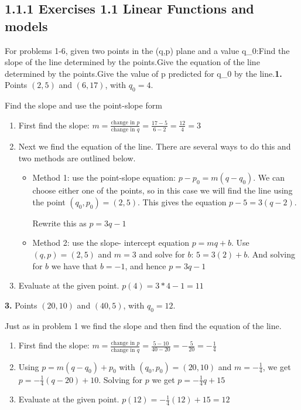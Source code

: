 \documentclass[10pt,]{book}
\theoremstyle{plain}
\theoremstyle{definition}
\begin{document}
\subsection*{1.1.1 Exercises 1.1 Linear Functions and models}
For problems 1-6, given two points in the (q,p) plane and a value q_0:Find the slope of the line determined by the points.Give the equation of the line determined by the points.Give the value of p predicted for q_0 by the line.\noindent\textbf{1.}\quad{} 
Points \((2,5)\) and \((6,17)\), with \(q_0=4\).
%
\par\smallskip
Find the slope and use the point-slope form%
\par\smallskip
\leavevmode%
\begin{enumerate}[label=(\alph*)]
\item\hypertarget{li-4}{}First find the slope: \(m=  \frac{\text{change in }p}{\text{change in }q}
=  \frac{17-5}{6-2}=\frac{12}{4}=3\)%
\item\hypertarget{li-5}{}Next we find the equation of the line. There are several ways to do this and two methods are outlined below.%
%
\begin{itemize}[label=\textbullet]
\item{}Method 1: use the point-slope equation: \(p-p_0=m (q-q_0)\).
We can choose either one of the points, so in this case we will find the line using the point \((q_0,p_0 )=(2,5)\). This gives the equation
\(p-5=3 (q-2)\).%
\par
Rewrite this as \(p=3q-1\)%
\item{}Method 2: use the slope- intercept equation \(p=m q+b\).
Use \((q,p)=(2,5)\) and \(m = 3\) and solve for \(b\):
\(5=3 (2)+b\).
And solving for \(b\) we have that \(b= -1\), and hence \(p=3q-1\)%
\end{itemize}
\item\hypertarget{li-8}{}Evaluate at the given point.  \(p(4)=3*4-1=11\)%
\end{enumerate}
\par\smallskip
\noindent\textbf{3.}\quad{} Points \((20,10)\) and \((40,5)\), with \(q_0=12\).
%
\par\smallskip
Just as in problem 1 we find the slope and then find the equation of the line.%
\leavevmode%
\begin{enumerate}[label=(\alph*)]
\item\hypertarget{li-9}{}First find the slope: \(m=  \frac{\text{change in }p}{\text{change in }q}
=  \frac{5-10}{40-20}=-\frac{5}{20}=-\frac{1}{4}\)%
\item\hypertarget{li-10}{}Using \(p=m (q-q_0)+p_0\) with \((q_0,p_0 )=(20, 10)\) and \(m = -\frac{1}{4}\), we get \(p=-\frac{1}{4}(q-20)+10\).  Solving for \(p\) we get \(p =-\frac{1}{4}q+15\)%
\item\hypertarget{li-11}{}Evaluate at the given point.  \(p(12)=-\frac{1}{4}(12)+15=12\)%
\end{enumerate}
\end{document}
